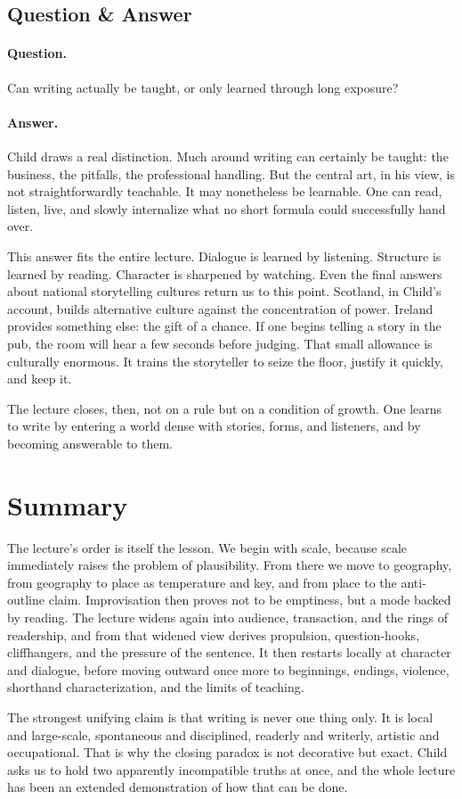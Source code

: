 \subsection{Question \& Answer}

\paragraph{Question.} Can writing actually be taught, or only learned through long exposure?

\paragraph{Answer.} Child draws a real distinction. Much around writing can certainly be taught: the business, the pitfalls, the professional handling. But the central art, in his view, is not straightforwardly teachable. It may nonetheless be learnable. One can read, listen, live, and slowly internalize what no short formula could successfully hand over.

This answer fits the entire lecture. Dialogue is learned by listening. Structure is learned by reading. Character is sharpened by watching. Even the final answers about national storytelling cultures return us to this point. Scotland, in Child's account, builds alternative culture against the concentration of power. Ireland provides something else: the gift of a chance. If one begins telling a story in the pub, the room will hear a few seconds before judging. That small allowance is culturally enormous. It trains the storyteller to seize the floor, justify it quickly, and keep it.

The lecture closes, then, not on a rule but on a condition of growth. One learns to write by entering a world dense with stories, forms, and listeners, and by becoming answerable to them.

\section{Summary}

The lecture's order is itself the lesson. We begin with scale, because scale immediately raises the problem of plausibility. From there we move to geography, from geography to place as temperature and key, and from place to the anti-outline claim. Improvisation then proves not to be emptiness, but a mode backed by reading. The lecture widens again into audience, transaction, and the rings of readership, and from that widened view derives propulsion, question-hooks, cliffhangers, and the pressure of the sentence. It then restarts locally at character and dialogue, before moving outward once more to beginnings, endings, violence, shorthand characterization, and the limits of teaching.

The strongest unifying claim is that writing is never one thing only. It is local and large-scale, spontaneous and disciplined, readerly and writerly, artistic and occupational. That is why the closing paradox is not decorative but exact. Child asks us to hold two apparently incompatible truths at once, and the whole lecture has been an extended demonstration of how that can be done.
